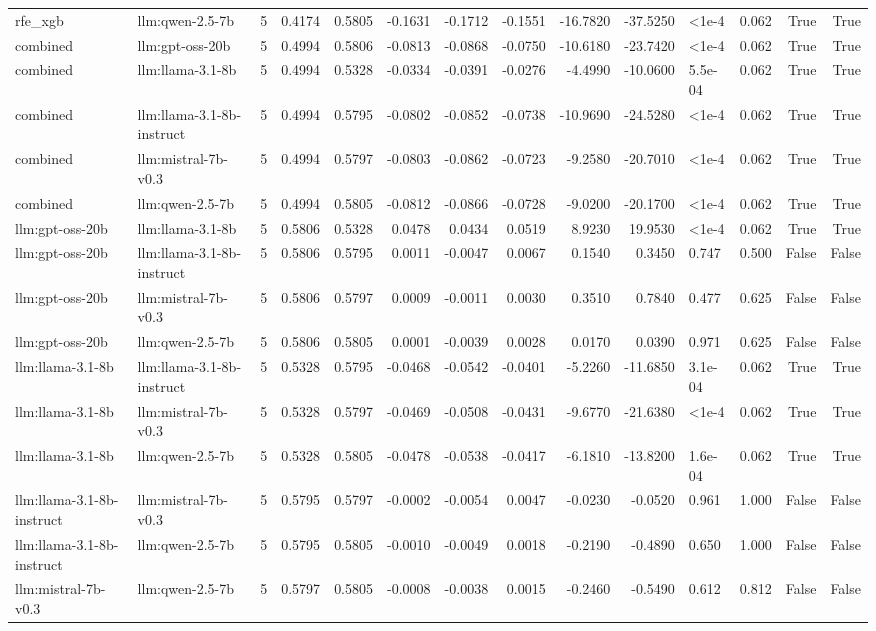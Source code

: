 \begin{tabular}{llrrrrrrrrllrr}
rfe_xgb & llm:qwen-2.5-7b & 5 & 0.4174 & 0.5805 & -0.1631 & -0.1712 & -0.1551 & -16.7820 & -37.5250 & <1e-4 & 0.062 & True & True \\
combined & llm:gpt-oss-20b & 5 & 0.4994 & 0.5806 & -0.0813 & -0.0868 & -0.0750 & -10.6180 & -23.7420 & <1e-4 & 0.062 & True & True \\
combined & llm:llama-3.1-8b & 5 & 0.4994 & 0.5328 & -0.0334 & -0.0391 & -0.0276 & -4.4990 & -10.0600 & 5.5e-04 & 0.062 & True & True \\
combined & llm:llama-3.1-8b-instruct & 5 & 0.4994 & 0.5795 & -0.0802 & -0.0852 & -0.0738 & -10.9690 & -24.5280 & <1e-4 & 0.062 & True & True \\
combined & llm:mistral-7b-v0.3 & 5 & 0.4994 & 0.5797 & -0.0803 & -0.0862 & -0.0723 & -9.2580 & -20.7010 & <1e-4 & 0.062 & True & True \\
combined & llm:qwen-2.5-7b & 5 & 0.4994 & 0.5805 & -0.0812 & -0.0866 & -0.0728 & -9.0200 & -20.1700 & <1e-4 & 0.062 & True & True \\
llm:gpt-oss-20b & llm:llama-3.1-8b & 5 & 0.5806 & 0.5328 & 0.0478 & 0.0434 & 0.0519 & 8.9230 & 19.9530 & <1e-4 & 0.062 & True & True \\
llm:gpt-oss-20b & llm:llama-3.1-8b-instruct & 5 & 0.5806 & 0.5795 & 0.0011 & -0.0047 & 0.0067 & 0.1540 & 0.3450 & 0.747 & 0.500 & False & False \\
llm:gpt-oss-20b & llm:mistral-7b-v0.3 & 5 & 0.5806 & 0.5797 & 0.0009 & -0.0011 & 0.0030 & 0.3510 & 0.7840 & 0.477 & 0.625 & False & False \\
llm:gpt-oss-20b & llm:qwen-2.5-7b & 5 & 0.5806 & 0.5805 & 0.0001 & -0.0039 & 0.0028 & 0.0170 & 0.0390 & 0.971 & 0.625 & False & False \\
llm:llama-3.1-8b & llm:llama-3.1-8b-instruct & 5 & 0.5328 & 0.5795 & -0.0468 & -0.0542 & -0.0401 & -5.2260 & -11.6850 & 3.1e-04 & 0.062 & True & True \\
llm:llama-3.1-8b & llm:mistral-7b-v0.3 & 5 & 0.5328 & 0.5797 & -0.0469 & -0.0508 & -0.0431 & -9.6770 & -21.6380 & <1e-4 & 0.062 & True & True \\
llm:llama-3.1-8b & llm:qwen-2.5-7b & 5 & 0.5328 & 0.5805 & -0.0478 & -0.0538 & -0.0417 & -6.1810 & -13.8200 & 1.6e-04 & 0.062 & True & True \\
llm:llama-3.1-8b-instruct & llm:mistral-7b-v0.3 & 5 & 0.5795 & 0.5797 & -0.0002 & -0.0054 & 0.0047 & -0.0230 & -0.0520 & 0.961 & 1.000 & False & False \\
llm:llama-3.1-8b-instruct & llm:qwen-2.5-7b & 5 & 0.5795 & 0.5805 & -0.0010 & -0.0049 & 0.0018 & -0.2190 & -0.4890 & 0.650 & 1.000 & False & False \\
llm:mistral-7b-v0.3 & llm:qwen-2.5-7b & 5 & 0.5797 & 0.5805 & -0.0008 & -0.0038 & 0.0015 & -0.2460 & -0.5490 & 0.612 & 0.812 & False & False \\
\bottomrule
\end{tabular}
